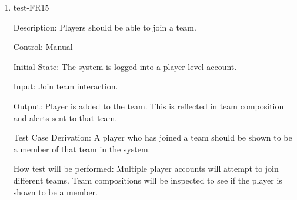 \documentclass[12pt, titlepage]{article}
\begin{document}
\begin{enumerate}


  \item{test-FR15\\}
  
  Description: Players should be able to join a team.

  Control: Manual

  Initial State: The system is logged into a player level account.

  Input: Join team interaction.

  Output: Player is added to the team. This is reflected in team composition
  and alerts sent to that team.

  Test Case Derivation: A player who has joined a team should be shown to be a
  member of that team in the system.

  How test will be performed: Multiple player accounts will attempt to join 
  different teams. Team compositions will be inspected to see if the player
  is shown to be a member. 








\end{enumerate}
\end{document}
